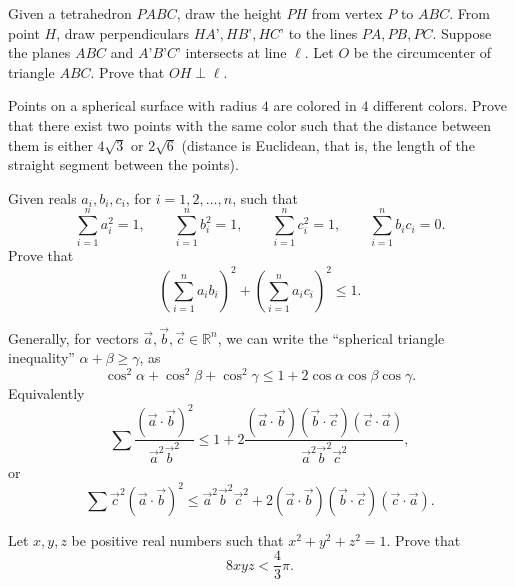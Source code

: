 \documentclass[12pt,a4paper]{memoir}
\theoremstyle{definition}
\begin{document}
\begin{question}[name={2017 St. Petersburg}]
	Given a tetrahedron $PABC$, draw the height $PH$ from vertex $P$ to $ABC$. From point $H$, draw perpendiculars $HA’,HB’,HC’$ to the lines $PA,PB,PC$. Suppose the planes $ABC$ and $A’B’C’$ intersects at line $\ell$. Let $O$ be the circumcenter of triangle $ABC$. Prove that $OH\perp \ell$.
\end{question}





\begin{question}[name={2018 Spain}]
	Points on a spherical surface with radius $4$ are colored in $4$ different colors. Prove that there exist two points with the same color such that the distance between them is either $4\sqrt{3}$ or $2\sqrt{6}$ (distance is Euclidean, that is, the length of the straight segment between the points).
\end{question}



\begin{question}
	Given reals $ a_i ,b_i,c_i$, for $ i=1,2,\dots,n$, such that \[\sum_{i=1}^n a_{i}^2=1, \qquad  \sum_{i=1}^n b_{i}^2=1, \qquad \sum_{i=1}^n c_{i}^2=1, \qquad \sum_{i=1}^n b_ic_i=0.\]
	Prove that $$\left(\sum_{i=1}^n a_ib_i\right)^2+\left(\sum_{i=1}^n a_ic_i\right)^2 \leq 1.$$
\end{question}



\begin{solution}[name={Solution by Spanferkel and Arqady}] 
	Generally, for vectors $ \vec a, \vec b, \vec c\in\mathbb R^n$, we can write the ``spherical triangle inequality'' $ \alpha + \beta\ge \gamma$, as
	\[ \cos^2\alpha + \cos^2\beta + \cos^2\gamma\le1 + 2\cos\alpha\cos\beta \cos\gamma.\]
	Equivalently
	\[ \sum\frac { (\vec a\cdot\vec b)^2}{\vec a^2\vec b^2}\le1 + 2\frac {(\vec a\cdot\vec b) (\vec b\cdot\vec c) (\vec c\cdot\vec a)}{\vec a^2\vec b^2\vec c^2},\]
	or
	\[ \sum { {\vec c^2}(\vec a\cdot\vec b)^2}\le \vec a^2\vec b^2\vec c^2 + 2(\vec a\cdot\vec b) (\vec b\cdot\vec c) (\vec c\cdot\vec a).\]
\end{solution}



\begin{question}[name={Spherical Inequality by Puuhikki}]
	Let $x,y,z$ be positive real numbers such that $x^{2}+y^{2}+z^{2}=1$. Prove that \[8xyz<\frac{4}{3}\pi.\]
\end{question}
\end{document}
